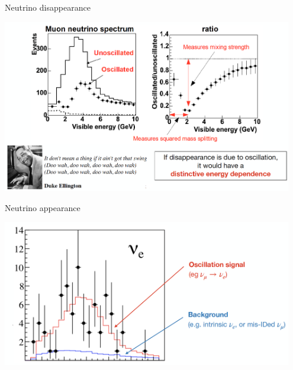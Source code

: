 \begin{frame}{Neutrino disappearance}

  \begin{center}
    \includegraphics[width=0.95\textwidth]{./images/osc101/disappearance_temp.png}
  \end{center}

\end{frame}

%
%
%

\begin{frame}{Neutrino appearance}

  \begin{center}
    \includegraphics[width=0.95\textwidth]{./images/osc101/appearance_temp.png}
  \end{center}

\end{frame}

%
%
%

